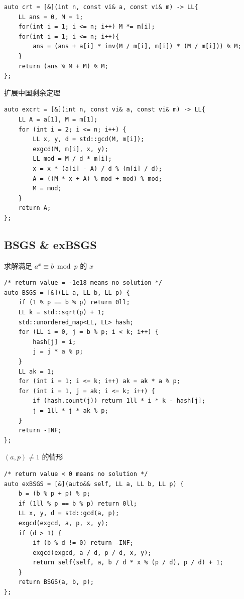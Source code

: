 \documentclass[UTF8, a4paper, titlepage, twoside]{ctexart}
\begin{document}
\begin{lstlisting}[style=cpp]
auto crt = [&](int n, const vi& a, const vi& m) -> LL{
    LL ans = 0, M = 1;
    for(int i = 1; i <= n; i++) M *= m[i];
    for(int i = 1; i <= n; i++){
        ans = (ans + a[i] * inv(M / m[i], m[i]) * (M / m[i])) % M;
    }
    return (ans % M + M) % M;
};
\end{lstlisting}

扩展中国剩余定理

\begin{lstlisting}[style=cpp]
auto excrt = [&](int n, const vi& a, const vi& m) -> LL{
    LL A = a[1], M = m[1];
    for (int i = 2; i <= n; i++) {
        LL x, y, d = std::gcd(M, m[i]);
        exgcd(M, m[i], x, y);
        LL mod = M / d * m[i];
        x = x * (a[i] - A) / d % (m[i] / d); 
        A = ((M * x + A) % mod + mod) % mod;
        M = mod;
    }
    return A;
};
\end{lstlisting}

\subsection{ BSGS \& exBSGS }

求解满足 $a ^ x \equiv b \bmod p$ 的 $x$

\begin{lstlisting}[style=cpp]
/* return value = -1e18 means no solution */
auto BSGS = [&](LL a, LL b, LL p) {
    if (1 % p == b % p) return 0ll;
    LL k = std::sqrt(p) + 1;
    std::unordered_map<LL, LL> hash;
    for (LL i = 0, j = b % p; i < k; i++) {
        hash[j] = i;
        j = j * a % p;
    }
    LL ak = 1;
    for (int i = 1; i <= k; i++) ak = ak * a % p;
    for (int i = 1, j = ak; i <= k; i++) {
        if (hash.count(j)) return 1ll * i * k - hash[j];
        j = 1ll * j * ak % p;
    }
    return -INF;
};
\end{lstlisting}

$(a, p) \neq 1$ 的情形

\begin{lstlisting}[style=cpp]
/* return value < 0 means no solution */
auto exBSGS = [&](auto&& self, LL a, LL b, LL p) {
    b = (b % p + p) % p;
    if (1ll % p == b % p) return 0ll;
    LL x, y, d = std::gcd(a, p);
    exgcd(exgcd, a, p, x, y);
    if (d > 1) {
        if (b % d != 0) return -INF;
        exgcd(exgcd, a / d, p / d, x, y);
        return self(self, a, b / d * x % (p / d), p / d) + 1;
    }
    return BSGS(a, b, p);
};
\end{lstlisting}
\end{document}
